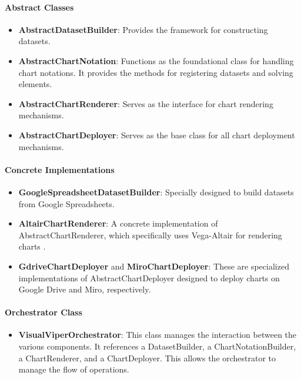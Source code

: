 \paragraph{Abstract Classes}\label{abstract-classes}

\begin{itemize}
\item
  \textbf{AbstractDatasetBuilder}: Provides the framework for
  constructing datasets.
\item
  \textbf{AbstractChartNotation}: Functions as the foundational class
  for handling chart notations. It provides the methods for registering
  datasets and solving elements.
\item
  \textbf{AbstractChartRenderer}: Serves as the interface for chart
  rendering mechanisms.
\item
  \textbf{AbstractChartDeployer}: Serves as the base class for all chart
  deployment mechanisms.
\end{itemize}

\paragraph{Concrete Implementations}\label{concrete-implementations}

\begin{itemize}
\item
  \textbf{GoogleSpreadsheetDatasetBuilder}: Specially designed to build
  datasets from Google Spreadsheets.
\item
  \textbf{AltairChartRenderer}: A concrete implementation of
  AbstractChartRenderer, which specifically uses Vega-Altair for
  rendering charts \cite{49}.
\item
  \textbf{GdriveChartDeployer} and \textbf{MiroChartDeployer}: These are
  specialized implementations of AbstractChartDeployer designed to
  deploy charts on Google Drive and Miro, respectively.
\end{itemize}

\paragraph{Orchestrator Class}\label{orchestrator-class}

\begin{itemize}
\item
  \textbf{VisualViperOrchestrator}: This class manages the interaction
  between the various components. It references a DatasetBuilder, a
  ChartNotationBuilder, a ChartRenderer, and a ChartDeployer. This
  allows the orchestrator to manage the flow of operations.
\end{itemize}

